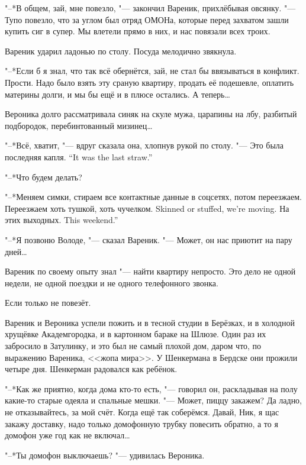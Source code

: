 \textspace

"--*В общем, зай, мне повезло, "--- закончил Вареник, прихлёбывая овсянку.
"--- Тупо повезло, что за углом был отряд ОМОНа, которые перед захватом зашли купить сиг в супер.
Мы влетели прямо в них, и нас повязали всех троих.

Вареник ударил ладонью по столу.
Посуда мелодично звякнула.

"--*Если б я знал, что так всё обернётся, зай, не стал бы ввязываться в конфликт.
Прости.
Надо было взять эту сраную квартиру, продать её подешевле, оплатить материны долги, и мы бы ещё и в плюсе остались.
А теперь\ldots{}

Вероника долго рассматривала синяк на скуле мужа, царапины на лбу, разбитый подбородок, перебинтованный мизинец\ldots{}

"--*Всё, хватит, "--- вдруг сказала она, хлопнув рукой по столу.
{"--- Это была последняя капля.}
{``It was the last straw.''}

"--*Что будем делать?

"--*Меняем симки, стираем все контактные данные в соцсетях, потом переезжаем.
{Переезжаем хоть тушкой, хоть чучелком.}
{Skinned or stuffed, we're moving.}
{На этих выходных.}
{This weekend.''}

"--*Я позвоню Володе, "--- сказал Вареник.
"--- Может, он нас приютит на пару дней\ldots{}

\asterism

\label{Thu_2012_06_07}

Вареник по своему опыту знал "--- найти квартиру непросто.
Это дело не одной недели, не одной поездки и не одного телефонного звонка.

Если только не повезёт.

Вареник и Вероника успели пожить и в тесной студии в Берёзках, и в холодной хрущёвке Академгородка, и в картонном бараке на Шлюзе.
Один раз их забросило в Затулинку, и это был не самый плохой дом, даром что, по выражению Вареника, <<жопа мира>>.
У Шенкермана в Бердске они прожили четыре дня.
Шенкерман радовался как ребёнок.

"--*Как же приятно, когда дома кто-то есть, "--- говорил он, раскладывая на полу какие-то старые одеяла и спальные мешки.
"--- Может, пиццу закажем?
Да ладно, не отказывайтесь, за мой счёт.
Когда ещё так соберёмся.
Давай, Ник, я щас закажу доставку, надо только домофонную трубку повесить обратно, а то я домофон уже год как не включал\ldots{}

"--*Ты домофон выключаешь? "--- удивилась Вероника.

